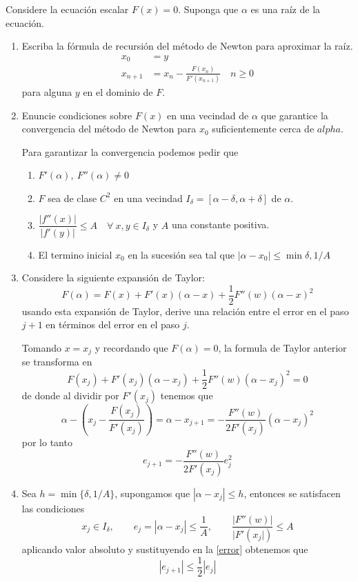 \vspace{1cm}
\begin{problema}
Considere la ecuación escalar \(F(x)=0\). Suponga que \(\alpha\) es una raíz de la ecuación.
\begin{enumerate}[label=\alph*)]
    \item Escriba la fórmula de recursión del método de Newton para aproximar la raíz.
    \begin{align*}
        x_0&=y\\[1em]
        x_{n+1}&=x_n-\frac{F(x_n)}{F'(x_{n+1})}\quad n\ge0
    \end{align*}
    para alguna \(y\) en el dominio de \(F\).

    \item Enuncie condiciones sobre \(F(x)\) en una vecindad de \(\alpha\) que garantice la convergencia del método de Newton para \(x_0\) suficientemente cerca de \(alpha\).
    
    Para garantizar la convergencia podemos pedir que
    \begin{enumerate}[label=\roman*)]
        \item \(F'(\alpha),\ F''(\alpha)\not=0\)
        \item \(F\) sea de clase \(C^2\) en una vecindad \(I_\delta=[\alpha-\delta, \alpha+\delta]\) de \(\alpha\).
        \item \(\dfrac{|f''(x)|}{|f'(y)|}\le A\quad\forall\ x,y\in I_\delta\) y \(A\) una constante positiva.
        \item El termino inicial $x_0$ en la sucesión sea tal que \(|\alpha-x_0|\le\min{\delta, 1/A}\)
    \end{enumerate}
    \item Considere la siguiente expansión de Taylor:
    \[F(\alpha)=F(x)+F'(x)(\alpha-x)+\frac{1}{2}F''(w)(\alpha-x)^2\]
    usando esta expansión de Taylor, derive una relación entre el error en el paso \(j+1\) en términos del error en el paso \(j\). 

    Tomando \(x=x_{j}\) y recordando que \(F(\alpha)=0\), la formula de Taylor anterior se transforma en  
    \[F(x_j)+F'(x_j)(\alpha-x_{j})+\frac{1}{2}F''(w)(\alpha-x_{j})^2=0\]
    de donde al dividir por \(F'(x_j)\) tenemos que
    \[\alpha-\left(x_j-\frac{F(x_j)}{F'(x_j)}\right)=\alpha-x_{j+1}=-\frac{F''(w)}{2F'(x_j)}(\alpha-x_j)^2\]
    por lo tanto \[e_{j+1}=-\frac{F''(w)}{2F'(x_j)}e_j^2\tag{\(\ast\)}\label{error}\]

    \item Sea \(h=\min\{\delta, 1/A\}\), supongamos que \(|\alpha-x_{j}|\le h\), entonces se satisfacen las condiciones \[x_j\in I_\delta,\qquad e_j=|\alpha-x_j|\le\frac{1}{A},\qquad\frac{|F''(w)|}{|F'(x_j|)}\le A\] aplicando valor absoluto y sustituyendo en la \cref{error} obtenemos que \[|e_{j+1}|\le\frac{1}{2}|e_j|\]
    

\end{enumerate}
\end{problema}
